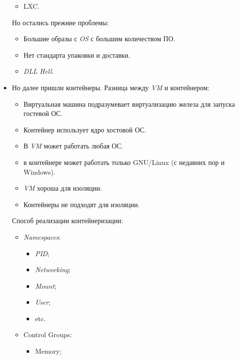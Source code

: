 \begin{itemize}
\begin{itemize}
            \item LXC.
        \end{itemize}
        Но остались прежние проблемы:
        \begin{itemize}
            \item Большие образы с \textit{OS} с большим количеством ПО.
            \item Нет стандарта упаковки и доставки.
            \item \textit{DLL Hell}.
        \end{itemize}
    \item Но далее пришли контейнеры. Разница между \textit{VM} и контейнером:
        \begin{itemize}
            \item Виртуальная машина подразумевает виртуализацию железа для запуска гостевой ОС.
            \item Контейнер использует ядро хостовой ОС.
            \item В \textit{VM} может работать любая ОС.
            \item в контейнере может работать только GNU/Linux (с недавних пор и Windows).
            \item \textit{VM} хороша для изоляции.
            \item Контейнеры не подходят для изоляции.
        \end{itemize}
        \newpage
        Способ реализации контейнеризации:
        \begin{itemize}
            \item \textit{Namespaces}:
                \begin{itemize}
                    \item \textit{PID};
                    \item \textit{Networking};
                    \item \textit{Mount};
                    \item \textit{User};
                    \item etc.
                \end{itemize}
            \item Control Groups:
                \begin{itemize}
                    \item Memory;

\end{itemize}
\end{itemize}
\end{itemize}
